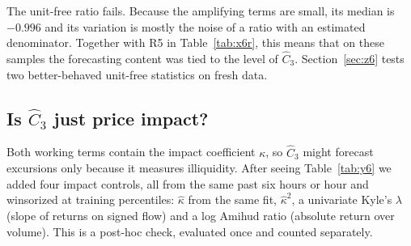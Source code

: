 \documentclass[12pt]{article}
\theoremstyle{definition}
\theoremstyle{remark}
\begin{document}
The unit-free ratio fails. Because the amplifying terms are small, its median is $-0.996$ and its variation is mostly the noise of a ratio with an estimated denominator. Together with R5 in Table~\ref{tab:x6r}, this means that on these samples the forecasting content was tied to the level of $\hat C_3$. Section~\ref{sec:z6} tests two better-behaved unit-free statistics on fresh data.

\subsection{Is $\hat C_3$ just price impact?}\label{sec:y8}
Both working terms contain the impact coefficient $\kappa$, so $\hat C_3$ might forecast excursions only because it measures illiquidity. After seeing Table~\ref{tab:y6} we added four impact controls, all from the same past six hours or hour and winsorized at training percentiles: $\hat\kappa$ from the same fit, $\hat\kappa^2$, a univariate Kyle's $\lambda$ \citep{kyle1985} (slope of returns on signed flow) and a log Amihud ratio \citep{amihud2002} (absolute return over volume). This is a post-hoc check, evaluated once and counted separately.
\end{document}

